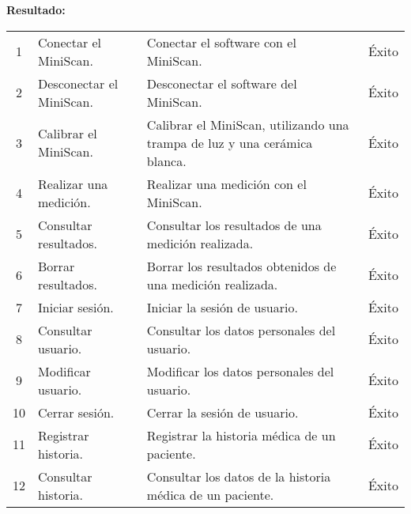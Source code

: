 \textbf{Resultado:}

\begin{table}[h]
	\centering
	\setlength{\extrarowheight}{\altocelda}
	\begin{tabulary}{\anchotabla}{|c|L|J|c|}
		\hline
		\thead{\textbf{\small{\#}}} &  &  & \\ \hline

			1 & Conectar el \hbox{MiniScan}. & Conectar el software con el MiniScan. & \'{E}xito \\ \hline
		
			2 & Desconectar el \hbox{MiniScan}. & Desconectar el software del MiniScan. & \'{E}xito \\ \hline
			
			3 & Calibrar el \hbox{MiniScan}. & Calibrar el MiniScan, utilizando una trampa de luz y una cer\'{a}mica blanca. & \'{E}xito \\ \hline
			
			4 & Realizar una medici\'{o}n. & Realizar una medici\'{o}n con el MiniScan. & \'{E}xito \\ \hline
			
			5 & Consultar resultados. & Consultar los resultados de una medici\'{o}n realizada. & \'{E}xito \\ \hline
			
			6 & Borrar resultados. & Borrar los resultados obtenidos de una medici\'{o}n realizada. & \'{E}xito \\ \hline
			
			7 & Iniciar sesi\'{o}n. & Iniciar la sesi\'{o}n de usuario. & \'{E}xito \\ \hline
			
			8 & Consultar usuario. & Consultar los datos personales del usuario. & \'{E}xito \\ \hline
			
			9 & Modificar usuario. & Modificar los datos personales del usuario. & \'{E}xito \\ \hline
			
			10 & Cerrar sesi\'{o}n. & Cerrar la sesi\'{o}n de usuario. & \'{E}xito \\ \hline
			
			11 & Registrar historia. & Registrar la historia m\'{e}dica de un paciente. & \'{E}xito \\ \hline
			
			12 & Consultar historia. & Consultar los datos de la historia m\'{e}dica de un paciente. & \'{E}xito \\ \hline
			

\end{tabulary}
\end{table}

